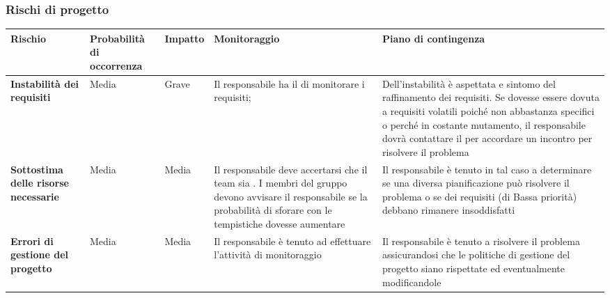 	\subsubsection{Rischi di progetto}
\renewcommand{\arraystretch}{1.5}
\begin{longtable}{| m{8em} | m{6em} | m{6em} | m{8em} | m{8em} |}
\hline 
\rowcolor{title_row}
\textbf{\color{title_text}Rischio} & \textbf{\color{title_text}Probabilità di occorrenza} & \textbf{\color{title_text}Impatto} & \textbf{\color{title_text}Monitoraggio} & \textbf{\color{title_text}Piano di contingenza} \\
\endhead
\hline \textbf{Instabilità dei requisiti} & Media & Grave &
	Il responsabile ha il \gl{compito} di monitorare i requisiti; &
	Dell'instabilità è aspettata e sintomo del raffinamento dei requisiti.	Se dovesse essere dovuta a requisiti volatili poiché non abbastanza specifici o perché in costante mutamento, il responsabile dovrà contattare il \gl{Proponente} per accordare un incontro per risolvere il problema \\
\hline \textbf{Sottostima delle risorse necessarie} & Media & Media &
	Il responsabile deve accertarsi che il team sia \gl{in-schedule}. I membri del gruppo devono avvisare il responsabile se la probabilità di sforare con le tempistiche dovesse aumentare &
	Il responsabile è tenuto in tal caso a determinare se una diversa pianificazione può risolvere il problema o se dei requisiti (di Bassa priorità) debbano rimanere insoddisfatti\\
\hline \textbf{Errori di gestione del progetto} & Media & Media &
	Il responsabile è tenuto ad effettuare l'attività di monitoraggio &
	Il responsabile è tenuto a risolvere il problema assicurandosi che le politiche di gestione del progetto siano rispettate ed eventualmente modificandole\\
\hline
\end{longtable}
\pagebreak
\renewcommand{\arraystretch}{1}		

